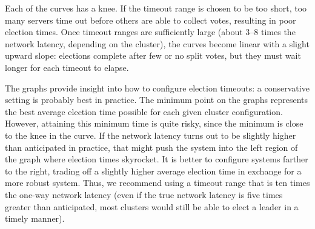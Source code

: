 Each of the curves has a knee. If the timeout range is chosen to be too
short, too many servers time out before others are able to collect
votes, resulting in poor election times. Once timeout ranges are
sufficiently large (about 3--8 times the network latency, depending on
the cluster), the curves become linear with a slight upward slope:
elections complete after few or no split votes, but they must wait
longer for each timeout to elapse.

The graphs provide insight into how to configure election timeouts: a
conservative setting is probably best in practice. The minimum point on
the graphs represents the best average election time possible for each
given cluster configuration. However, attaining this minimum time is
quite risky, since the minimum is close to the knee in the curve. If the
network latency turns out to be slightly higher than anticipated in
practice, that might push the system into the left region of the graph
where election times skyrocket. It is better to configure systems
farther to the right, trading off a slightly higher average election
time in exchange for a more robust system. Thus, we recommend using a
timeout range that is ten times the one-way network latency (even if the
true network latency is five times greater than anticipated, most clusters would
still be able to elect a leader in a timely manner).
